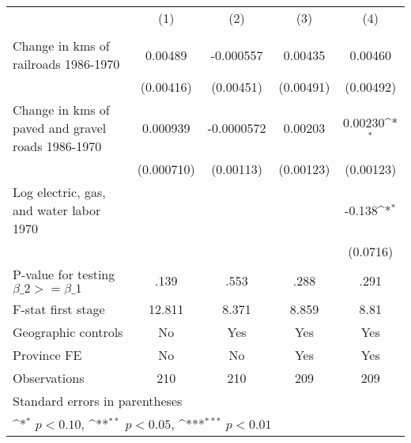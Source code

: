 {
\def\sym#1{\ifmmode^{#1}\else\(^{#1}\)\fi}
\begin{tabular}{l*{4}{c}}
\hline\hline
                &\multicolumn{1}{c}{(1)}&\multicolumn{1}{c}{(2)}&\multicolumn{1}{c}{(3)}&\multicolumn{1}{c}{(4)}\\
                &\multicolumn{1}{c}{}&\multicolumn{1}{c}{}&\multicolumn{1}{c}{}&\multicolumn{1}{c}{}\\
\hline
Change in kms of railroads 1986-1970&  0.00489         &-0.000557         &  0.00435         &  0.00460         \\
                &(0.00416)         &(0.00451)         &(0.00491)         &(0.00492)         \\
[1em]
Change in kms of paved and gravel roads 1986-1970& 0.000939         &-0.0000572         &  0.00203         &  0.00230\sym{*}  \\
                &(0.000710)         &(0.00113)         &(0.00123)         &(0.00123)         \\
[1em]
Log electric, gas, and water labor 1970&                  &                  &                  &   -0.138\sym{*}  \\
                &                  &                  &                  & (0.0716)         \\
\hline
P-value for testing $\beta\_{2} >= \beta\_{1}$&     .139         &     .553         &     .288         &     .291         \\
F-stat first stage&   12.811         &    8.371         &    8.859         &     8.81         \\
Geographic controls&       No         &      Yes         &      Yes         &      Yes         \\
Province FE     &       No         &       No         &      Yes         &      Yes         \\
Observations    &      210         &      210         &      209         &      209         \\
\hline\hline
\multicolumn{5}{l}{\footnotesize Standard errors in parentheses}\\
\multicolumn{5}{l}{\footnotesize \sym{*} \(p<0.10\), \sym{**} \(p<0.05\), \sym{***} \(p<0.01\)}\\
\end{tabular}
}
